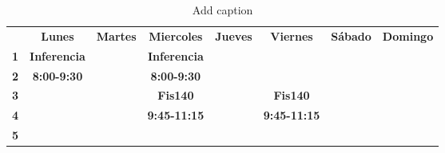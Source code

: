 \begin{table}[htbp]
	\centering
	\caption{Add caption}
	\begin{tabular}{cccccccc}
		\rowcolor[rgb]{ 1,  .851,  .4}       & \multicolumn{1}{p{7.645em}}{\textbf{Lunes}} & \multicolumn{1}{p{7.285em}}{\textbf{Martes}} & \multicolumn{1}{p{5.355em}}{\textbf{Miercoles}} & \multicolumn{1}{p{5.355em}}{\textbf{Jueves}} & \multicolumn{1}{p{5.355em}}{\textbf{Viernes}} & \multicolumn{1}{p{5.355em}}{\textbf{Sábado}} & \multicolumn{1}{p{5.355em}}{\textbf{Domingo}} \\
		\rowcolor[rgb]{ 1,  .851,  .4} \textbf{1} & \multicolumn{1}{p{7.645em}}{\cellcolor[rgb]{ .988,  .898,  .804}\textbf{Inferencia}} & \cellcolor[rgb]{ .718,  .718,  .718} & \multicolumn{1}{p{5.355em}}{\cellcolor[rgb]{ .988,  .898,  .804}\textbf{Inferencia}} & \cellcolor[rgb]{ .718,  .718,  .718} & \cellcolor[rgb]{ .718,  .718,  .718} & \cellcolor[rgb]{ .718,  .718,  .718} & \cellcolor[rgb]{ .718,  .718,  .718} \\
		\rowcolor[rgb]{ 1,  .851,  .4} \textbf{2} & \multicolumn{1}{p{7.645em}}{\cellcolor[rgb]{ .988,  .898,  .804}\textbf{8:00-9:30}} & \cellcolor[rgb]{ .718,  .718,  .718} & \multicolumn{1}{p{5.355em}}{\cellcolor[rgb]{ .988,  .898,  .804}\textbf{8:00-9:30}} & \cellcolor[rgb]{ .718,  .718,  .718} & \cellcolor[rgb]{ .718,  .718,  .718} & \cellcolor[rgb]{ .718,  .718,  .718} & \cellcolor[rgb]{ .718,  .718,  .718} \\
		\rowcolor[rgb]{ 1,  .851,  .4} \textbf{3} & \cellcolor[rgb]{ .718,  .718,  .718} & \cellcolor[rgb]{ .718,  .718,  .718} & \multicolumn{1}{p{5.355em}}{\cellcolor[rgb]{ 1,  .6,  0}\textbf{Fis140}} & \cellcolor[rgb]{ .718,  .718,  .718} & \multicolumn{1}{p{5.355em}}{\cellcolor[rgb]{ 1,  .6,  0}\textbf{Fis140}} & \cellcolor[rgb]{ .718,  .718,  .718} & \cellcolor[rgb]{ .718,  .718,  .718} \\
		\rowcolor[rgb]{ 1,  .851,  .4} \textbf{4} & \cellcolor[rgb]{ .718,  .718,  .718} & \cellcolor[rgb]{ .718,  .718,  .718} & \multicolumn{1}{p{5.355em}}{\cellcolor[rgb]{ 1,  .6,  0}\textbf{9:45-11:15}} & \cellcolor[rgb]{ .718,  .718,  .718} & \multicolumn{1}{p{5.355em}}{\cellcolor[rgb]{ 1,  .6,  0}\textbf{9:45-11:15}} & \cellcolor[rgb]{ .718,  .718,  .718} & \cellcolor[rgb]{ .718,  .718,  .718} \\
		\rowcolor[rgb]{ 1,  .851,  .4} \textbf{5} & \cellcolor[rgb]{ .718,  .718,  .718} & \cellcolor[rgb]{ .718,  .718,  .718} & \cellcolor[rgb]{ .718,  .718,  .718} & \cellcolor[rgb]{ .718,  .718,  .718} & \cellcolor[rgb]{ .718,  .718,  .718} & \cellcolor[rgb]{ .718,  .718,  .718} & \cellcolor[rgb]{ .718,  .718,  .718} \\

\end{tabular}
\end{table}
